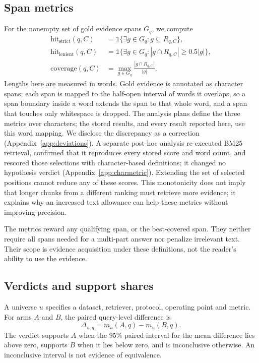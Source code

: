 \documentclass[11pt]{article}
\newcommand{\ind}{\mathbb{1}}
\begin{document}
\subsection{Span metrics}
For the nonempty set of gold evidence spans $G_q$, we compute
\begin{align}
\mathrm{hit}_{\mathrm{strict}}(q,C)&=\ind\{\exists g\in G_q:g\subseteq R_{q,C}\},\\
\mathrm{hit}_{\mathrm{lenient}}(q,C)&=\ind\{\exists g\in G_q:|g\cap R_{q,C}|\geq0.5|g|\},\\
\mathrm{coverage}(q,C)&=\max_{g\in G_q}\frac{|g\cap R_{q,C}|}{|g|}.
\label{eq:coverage}
\end{align}
Lengths here are measured in words. Gold evidence is annotated as character spans; each span is mapped to the half-open interval of words it overlaps, so a span boundary inside a word extends the span to that whole word, and a span that touches only whitespace is dropped. The analysis plans define the three metrics over characters; the stored results, and every result reported here, use this word mapping. We disclose the discrepancy as a correction (Appendix~\ref{app:deviations}). A separate post-hoc analysis re-executed BM25 retrieval, confirmed that it reproduces every stored score and word count, and rescored those selections with character-based definitions; it changed no hypothesis verdict (Appendix~\ref{app:charmetric}). Extending the set of selected positions cannot reduce any of these scores. This monotonicity does not imply that longer chunks from a different ranking must retrieve more evidence; it explains why an increased text allowance can help these metrics without improving precision.

The metrics reward any qualifying span, or the best-covered span. They neither require all spans needed for a multi-part answer nor penalize irrelevant text. Their scope is evidence acquisition under these definitions, not the reader's ability to use the evidence.

\subsection{Verdicts and support shares}\label{sec:estimand}
A universe $u$ specifies a dataset, retriever, protocol, operating point and metric. For arms $A$ and $B$, the paired query-level difference is
\begin{equation}
\Delta_{u,q}=m_u(A,q)-m_u(B,q).
\end{equation}
The verdict supports $A$ when the 95\% paired interval for the mean difference lies above zero, supports $B$ when it lies below zero, and is inconclusive otherwise. An inconclusive interval is not evidence of equivalence.
\end{document}
